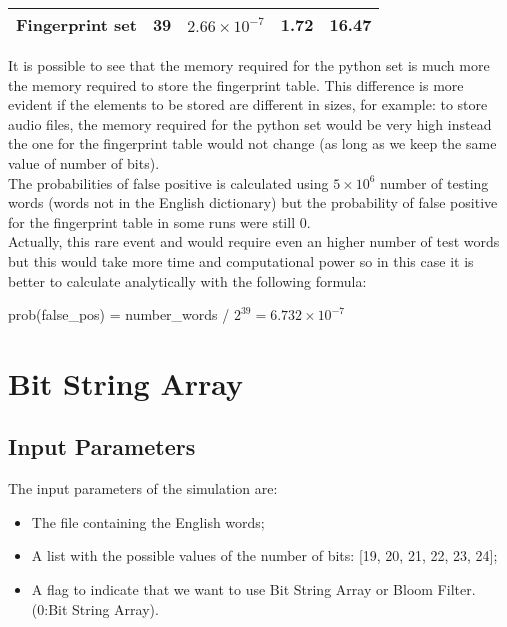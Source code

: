 \documentclass[twocolumn,letterpaper]{report}
\begin{document}
{\begin{table}[h!]
{\begin{tabular}{|l|c|c|c|c|}
						\textbf{Fingerprint set} &
						  39 &
						  $2.66 \times 10^{- 7}$ &
						  1.72 &
						  16.47 \\ \hline
						\end{tabular}
						}
				\end{table}
				It is possible to see that  the memory required for the python set is much more the memory required to store the fingerprint table. This difference is more evident if the elements to be stored are different in sizes, for example: to store audio files, the memory required for the python set would be very high instead the one for the fingerprint table would not change (as long as we keep the same value of number of bits). \\
				The probabilities of false positive is calculated using $ 5 \times 10^{6}$ number of testing words (words not in the English dictionary) but the probability of false positive for the fingerprint table in some runs were still 0. \\
				Actually, this rare event and would require even an higher number of test words but this would take more time and computational power so in this case it is better to calculate analytically with the following formula:
				\begin{center}
					prob(false\_pos) = number\_words / $2^{39} =  6.732 \times 10^{-7}$
			\end{center}
				
					
			
			\section{Bit String Array}	 
	 
				\subsection{Input Parameters}
					The input parameters of the simulation are:
					\begin{itemize}
						\item The file containing the English words;
						\item A list with the possible values of the number of bits: [19, 20, 21, 22, 23, 24];
						\item A flag to indicate that we want to use Bit String Array or Bloom Filter. (0:Bit String Array).
					\end{itemize}
					 
}
\end{document}
